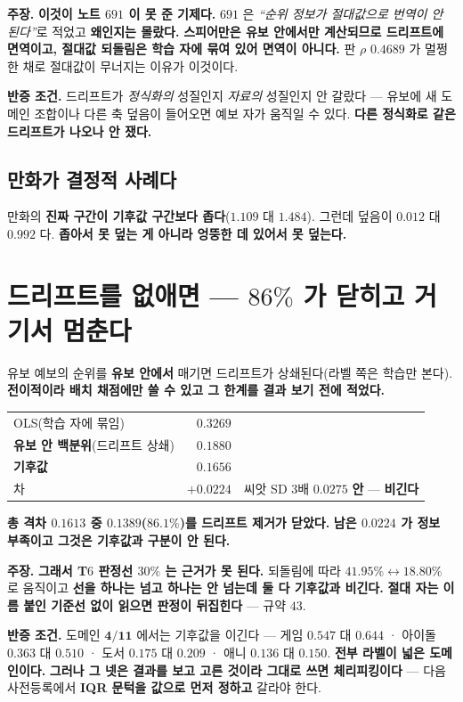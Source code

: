\documentclass[10pt,a4paper]{article}
\newcommand{\claim}[2]{\begin{claimbox}\textbf{주장.} #1\par\smallskip
  \textcolor{gray!70}{\textbf{반증 조건.} #2}\end{claimbox}}
\begin{document}
\claim{\textbf{이것이 노트 $691$ 이 못 준 기제다.} $691$ 은 \emph{``순위 정보가
절대값으로 번역이 안 된다''}로 적었고 \textbf{왜인지는 몰랐다.} \textbf{스피어만은
유보 안에서만 계산되므로 드리프트에 면역이고, 절대값 되돌림은 학습 자에 묶여 있어
면역이 아니다.} 판 $\rho$ $0.4689$ 가 멀쩡한 채로 절대값이 무너지는 이유가 이것이다.}
{드리프트가 \emph{정식화의} 성질인지 \emph{자료의} 성질인지 안 갈랐다 --- 유보에
새 도메인 조합이나 다른 축 덮음이 들어오면 예보 자가 움직일 수 있다.
\textbf{다른 정식화로 같은 드리프트가 나오나 안 쟀다.}}

\subsection*{만화가 결정적 사례다}

만화의 \textbf{진짜 구간이 기후값 구간보다 좁다}($1.109$ 대 $1.484$). 그런데
덮음이 $\mathbf{0.012}$ 대 $\mathbf{0.992}$ 다. \textbf{좁아서 못 덮는 게 아니라
엉뚱한 데 있어서 못 덮는다.}

\section{드리프트를 없애면 --- $86\%$ 가 닫히고 거기서 멈춘다}

유보 예보의 순위를 \textbf{유보 안에서} 매기면 드리프트가 상쇄된다(라벨 쪽은 학습만
본다). \textbf{전이적이라 배치 채점에만 쓸 수 있고 그 한계를 결과 보기 전에 적었다.}

\begin{center}
\begin{tabular}{lrl}
\toprule
OLS(학습 자에 묶임) & $0.3269$ & \\
\textbf{유보 안 백분위}(드리프트 상쇄) & $\mathbf{0.1880}$ & \\
\textbf{기후값} & $\mathbf{0.1656}$ & \\
\midrule
차 & $+0.0224$ & \textcolor{BrickRed}{씨앗 SD $3$배 $0.0275$ \textbf{안} --- \textbf{비긴다}} \\
\bottomrule
\end{tabular}
\end{center}

\textbf{총 격차 $0.1613$ 중 $0.1389$($\mathbf{86.1\%}$)를 드리프트 제거가 닫았다.}
\textbf{남은 $0.0224$ 가 정보 부족이고 그것은 기후값과 구분이 안 된다.}

\claim{\textbf{그래서 T$6$ 판정선 $30\%$ 는 근거가 못 된다.} 되돌림에 따라
$41.95\% \leftrightarrow 18.80\%$ 로 움직이고 \textbf{선을 하나는 넘고 하나는 안
넘는데 둘 다 기후값과 비긴다.} \textbf{절대 자는 이름 붙인 기준선 없이 읽으면
판정이 뒤집힌다} --- 규약 $43$.}
{도메인 $\mathbf{4/11}$ 에서는 기후값을 이긴다 --- 게임 $0.547$ 대 $0.644$ · 아이돌
$0.363$ 대 $0.510$ · 도서 $0.175$ 대 $0.209$ · 애니 $0.136$ 대 $0.150$.
\textbf{전부 라벨이 넓은 도메인이다.} \textbf{그러나 그 넷은 결과를 보고 고른
것이라 그대로 쓰면 체리피킹이다} --- 다음 사전등록에서 \textbf{IQR 문턱을 값으로
먼저 정하고} 갈라야 한다.}
\end{document}
